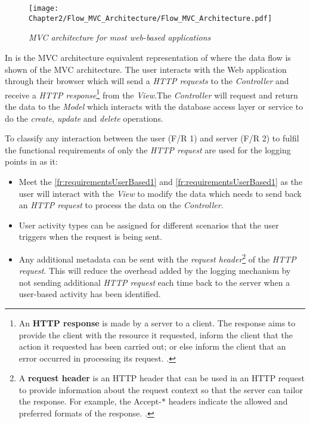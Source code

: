 \begin{figure}[!htb] %
	\centering %
	\texttt{[image: Chapter2/Flow\_MVC\_Architecture/Flow\_MVC\_Architecture.pdf]}
	\caption[MVC architecture for most web-based applications]
	{\textit{MVC architecture for most web-based applications \cite{Gu2010}}}\label{fig:ch2_flowMVC_Architecture}
\end{figure}

In  is the MVC architecture equivalent representation of  where the data flow is shown of the MVC architecture. The user interacts with the Web application through their browser which will send a \textit{HTTP requests} to the \textit{Controller} and receive a \textit{HTTP response}\footnote{An \textbf{HTTP response} is made by a server to a client. The response aims to provide the client with the resource it requested, inform the client that the action it requested has been carried out; or else inform the client that an error occurred in processing its request. \cite{IBM2021a}.} from the \textit{View}.The \textit{Controller} will request and return the data to the \textit{Model} which interacts with the database access layer or service to do the \textit{create}, \textit{update} and \textit{delete} operations.\par To classify any interaction between the user (F/R 1) and server (F/R 2) to fulfil the functional requirements of  only the \textit{HTTP request} are used for the logging points in  as it:

\begin{itemize}
	\item Meet the \ref{fr:requirementsUserBased1} and \ref{fr:requirementsUserBased1} as the user will interact with the \textit{View} to modify the data which needs to send back an \textit{HTTP request} to process the data on the \textit{Controller}.
	\item User activity types can be assigned for different scenarios that the user triggers when the request is being sent. 
	\item Any additional metadata can be sent with the \textit{request header}\footnote{A \textbf{request header} is an HTTP header that can be used in an HTTP request to provide information about the request context so that the server can tailor the response. For example, the Accept-$\ast$ headers indicate the allowed and preferred formats of the response. \cite{Mozilla2022}.} of the \textit{HTTP request}. This will reduce the overhead added by the logging mechanism by not sending additional \textit{HTTP request} each time back to the server when a user-based activity has been identified.
\end{itemize}

